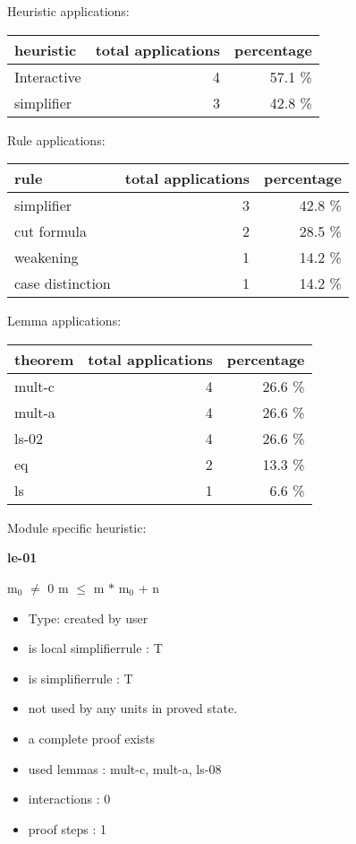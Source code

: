 \documentclass[a4paper]{article}
\begin{document}
\medskip


Heuristic applications:

\begin{supertabular}{l|r|r}
heuristic	& total applications & percentage \\ \hline
Interactive & 4 & 57.1 \% \\
simplifier & 3 & 42.8 \% \\

\end{supertabular}

Rule applications:

\begin{supertabular}{l|r|r}
rule	        & total applications & percentage \\ \hline
simplifier & 3 & 42.8 \% \\
cut formula & 2 & 28.5 \% \\
weakening & 1 & 14.2 \% \\
case distinction & 1 & 14.2 \% \\

\end{supertabular}

Lemma applications:

\begin{supertabular}{l|r|r}
theorem	        & total applications & percentage \\ \hline
mult-c & 4 & 26.6 \% \\
mult-a & 4 & 26.6 \% \\
ls-02 & 4 & 26.6 \% \\
eq & 2 & 13.3 \% \\
ls & 1 & 6.6 \% \\

\end{supertabular}

Module specific heuristic:

\pagebreak

{\LARGE\bf le-01}\label{lemma-le-01}

\medskip

 \Fol $\mbox{m}_{0}$ $\neq$ 0 \Imp m $\le$ m $*$ $\mbox{m}_{0}$ + n

\begin{itemize}

\item Type: created by user

\item is local simplifierrule : T
\item is simplifierrule : T
\item not used by any units in proved state.
\item       a complete proof exists
\item       used lemmas  : mult-c, mult-a, ls-08
\item       interactions : 0
\item       proof steps  : 1
\end{itemize}
\end{document}
